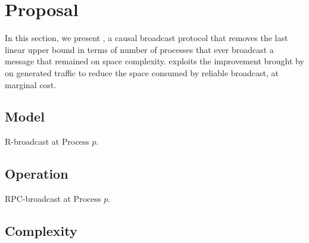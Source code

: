 
\section{Proposal}
\label{sec:proposal}

In this section, we present \RPCBROADCAST, a causal broadcast protocol that
removes the last linear upper bound in terms of number of processes that ever
broadcast a message that remained on space complexity. \RPCBROADCAST exploits
the improvement brought by \PCBROADCAST on generated traffic to reduce the space
consumed by reliable broadcast, at marginal cost.

\subsection{Model}

\begin{algorithm}[h]
  
  \caption{\label{algo:reliablebroadcast}R-broadcast at Process $p$.}
\end{algorithm}

\subsection{Operation}

\begin{algorithm}[h]
  
  \caption{\label{algo:rpcbroadcast}RPC-broadcast at Process $p$.}
\end{algorithm}

\subsection{Complexity}


